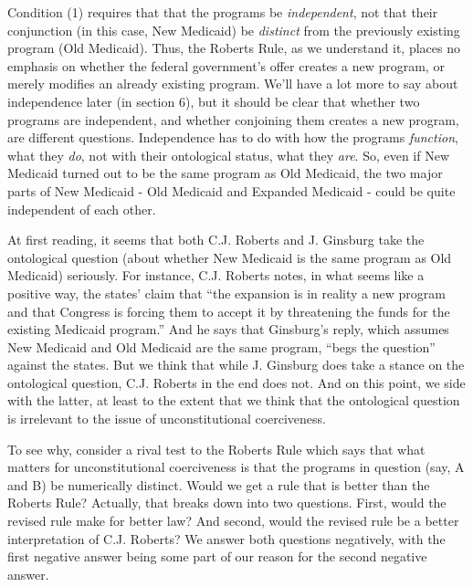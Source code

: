 \documentclass[
  11pt,
  letterpaper,
  DIV=11,
  numbers=noendperiod,
  oneside]{scrartcl}
\begin{document}
Condition (1) requires that that the programs be \emph{independent}, not
that their conjunction (in this case, New Medicaid) be \emph{distinct}
from the previously existing program (Old Medicaid). Thus, the Roberts
Rule, as we understand it, places no emphasis on whether the federal
government's offer creates a new program, or merely modifies an already
existing program. We'll have a lot more to say about independence later
(in section 6), but it should be clear that whether two programs are
independent, and whether conjoining them creates a new program, are
different questions. Independence has to do with how the programs
\emph{function}, what they \emph{do}, not with their ontological status,
what they \emph{are}. So, even if New Medicaid turned out to be the same
program as Old Medicaid, the two major parts of New Medicaid - Old
Medicaid and Expanded Medicaid - could be quite independent of each
other.

At first reading, it seems that both C.J. Roberts and J. Ginsburg take
the ontological question (about whether New Medicaid is the same program
as Old Medicaid) seriously. For instance, C.J. Roberts notes, in what
seems like a positive way, the states' claim that ``the expansion is in
reality a new program and that Congress is forcing them to accept it by
threatening the funds for the existing Medicaid program.'' And he says that Ginsburg's reply, which assumes New Medicaid
and Old Medicaid are the same program, ``begs the question'' against the
states. But we think that while J. Ginsburg does
take a stance on the ontological question, C.J. Roberts in the end does
not. And on this point, we side with the latter, at least to the extent
that we think that the ontological question is irrelevant to the issue
of unconstitutional coerciveness.

To see why, consider a rival test to the Roberts Rule which says that
what matters for unconstitutional coerciveness is that the programs in
question (say, A and B) be numerically distinct. Would we get a rule
that is better than the Roberts Rule? Actually, that breaks down into
two questions. First, would the revised rule make for better law? And
second, would the revised rule be a better interpretation of C.J.
Roberts? We answer both questions negatively, with the first negative
answer being some part of our reason for the second negative answer.
\end{document}
